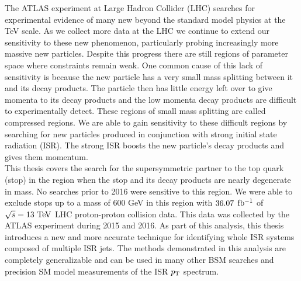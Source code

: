 
\indent The ATLAS experiment at Large Hadron Collider (LHC) searches for experimental evidence of many new beyond the standard model physics at the TeV scale.   As we collect more data at the LHC we continue to extend our sensitivity to these new phenomenon, particularly probing increasingly more massive new particles.  Despite this progress there are still regions of parameter space where constraints remain weak.   One common cause of this lack of sensitivity is because the new particle has a very small mass splitting between it and its decay products.  The particle then has little energy left over to give momenta to its decay products and the low momenta decay products are difficult to experimentally detect. These regions of small mass splitting are called compressed regions.  We are able to gain sensitivity to these difficult regions by searching for new particles produced in conjunction with strong initial state radiation (ISR).  The strong ISR boosts the new particle's decay products and gives them momentum.  \\

\indent This thesis covers the search for the supersymmetric partner to the top quark (stop) in the region when the stop and its decay products are nearly degenerate in mass.  No searches prior to 2016 were sensitive to this region.  We were able to exclude stops up to a mass of 600 GeV in this region with $36.07$ $\mbox{fb$^{-1}$}$ of $\sqrt{s} = 13 \tev$ LHC proton-proton collision data.  This data was collected by the ATLAS experiment during 2015 and 2016.  As part of this analysis, this thesis introduces a new and more accurate technique for identifying whole ISR systems composed of multiple ISR jets.   The methods demonstrated in this analysis are completely generalizable and can be used in many other BSM searches and precision SM model measurements of the ISR $p_{\mathrm{T}}$ spectrum.
